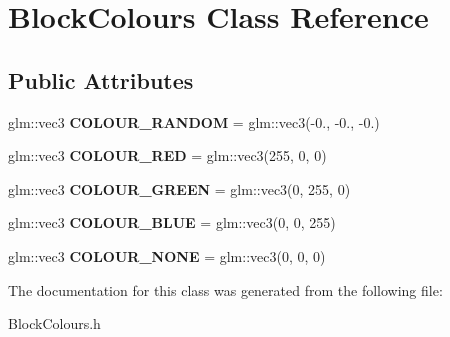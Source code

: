 \hypertarget{classBlockColours}{\section{Block\-Colours Class Reference}
\label{classBlockColours}
}
\subsection*{Public Attributes}
\begin{DoxyCompactItemize}
\item 
\hypertarget{classBlockColours_a163b4bcb68e7a8125fa75492d0de0f74}{glm\-::vec3 {\bfseries C\-O\-L\-O\-U\-R\-\_\-\-R\-A\-N\-D\-O\-M} = glm\-::vec3(-\/0., -\/0., -\/0.)}\label{classBlockColours_a163b4bcb68e7a8125fa75492d0de0f74}

\item 
\hypertarget{classBlockColours_a6146f2089aa5aed2fc8460d1104d12cb}{glm\-::vec3 {\bfseries C\-O\-L\-O\-U\-R\-\_\-\-R\-E\-D} = glm\-::vec3(255, 0, 0)}\label{classBlockColours_a6146f2089aa5aed2fc8460d1104d12cb}

\item 
\hypertarget{classBlockColours_adf672de5a16ac2b4809eed23ccde6164}{glm\-::vec3 {\bfseries C\-O\-L\-O\-U\-R\-\_\-\-G\-R\-E\-E\-N} = glm\-::vec3(0, 255, 0)}\label{classBlockColours_adf672de5a16ac2b4809eed23ccde6164}

\item 
\hypertarget{classBlockColours_a176ffc07cdacf5f095650e55a8e651fb}{glm\-::vec3 {\bfseries C\-O\-L\-O\-U\-R\-\_\-\-B\-L\-U\-E} = glm\-::vec3(0, 0, 255)}\label{classBlockColours_a176ffc07cdacf5f095650e55a8e651fb}

\item 
\hypertarget{classBlockColours_a391d047f40a0b6eb496b2795d46cb963}{glm\-::vec3 {\bfseries C\-O\-L\-O\-U\-R\-\_\-\-N\-O\-N\-E} = glm\-::vec3(0, 0, 0)}\label{classBlockColours_a391d047f40a0b6eb496b2795d46cb963}

\end{DoxyCompactItemize}


The documentation for this class was generated from the following file\-:\begin{DoxyCompactItemize}
\item 
Block\-Colours.\-h\end{DoxyCompactItemize}
